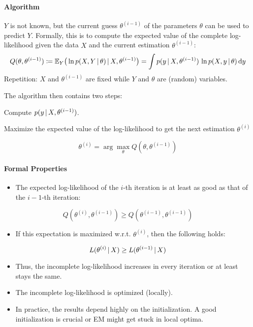 				\paragraph{Algorithm}
					\(Y\) is not known, but the current guess \( \theta^{(i - 1)} \) of the parameters \(\theta\) can be used to predict \(Y\). Formally, this is to compute the expected value of the complete log-likelihood given the data \(X\) and the current estimation \(\theta^{(i - 1)}\):
					\begin{equation}
						Q(\theta, \theta^{(i - 1)}) \coloneqq \mathbb{E}_Y\big( \ln p(X, Y \,\vert\, \theta) \,\vert\, X, \theta^{(i - 1)} \big) = \int p(y \,\vert\, X, \theta^{(i - 1)}) \,\ln p(X, y \,\vert\, \theta) \dd{y}
					\end{equation}
					Repetition: \(X\) and \(\theta^{(i - 1)}\) are fixed while \(Y\) and \(\theta\) are (random) variables.

					The algorithm then contains two steps:
					\begin{description}[leftmargin = 5cm]
						\item[E-Step (Expectation)] Compute \( p(y \,\vert\, X, \theta^{(i - 1)}) \).
						\item[M-Step (Maximization)] Maximize the expected value of the log-likelihood to get the next estimation \( \theta^{(i)} \)
					\end{description}
					\begin{equation}
						\theta^{(i)} = \arg\max\limits_\theta Q(\theta, \theta^{(i - 1)})
					\end{equation}

				\paragraph{Formal Properties}
					\begin{itemize}
						\item The expected log-likelihood of the \(i\)-th iteration is at least as good as that of the \(i - 1\)-th iteration:
					\end{itemize}
					\begin{equation}
						Q(\theta^{(i)}, \theta^{(i - 1)}) \geq Q(\theta^{(i - 1)}, \theta^{(i - 1)})
					\end{equation}
					\begin{itemize}
						\item If this expectation is maximized w.r.t. \(\theta^{(i)}\), then the following holds:
					\end{itemize}
					\begin{equation}
						L(\theta^{(i)} \,\vert\, X) \geq L(\theta^{(i - 1)} \,\vert\, X)
					\end{equation}
					\begin{itemize}
						\item Thus, the incomplete log-likelihood increases in every iteration or at least stays the same.
						\item The incomplete log-likelihood is optimized (locally).
						\item In practice, the results depend highly on the initialization. A good initialization is crucial or EM might get stuck in local optima.
					\end{itemize}

